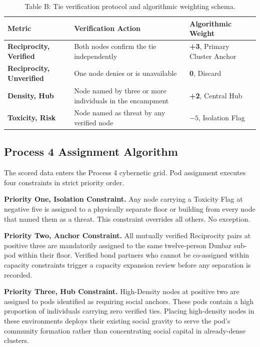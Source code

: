 \documentclass[12pt, letterpaper]{article}
\renewcommand{\arraystretch}{1.3}
\begin{document}
\begin{table}[H]
\renewcommand{\arraystretch}{1.2}
\begin{tabularx}{\textwidth}{@{} >{\raggedright\arraybackslash}p{3.5cm} >{\raggedright\arraybackslash}X >{\raggedright\arraybackslash}p{5.5cm} @{}}
\toprule
\textbf{Metric} & \textbf{Verification Action} & \textbf{Algorithmic Weight} \\
\midrule
\textbf{Reciprocity, Verified} & Both nodes confirm the tie independently & \textbf{+3}, Primary Cluster Anchor \\
\textbf{Reciprocity, Unverified} & One node denies or is unavailable & \textbf{0}, Discard \\
\textbf{Density, Hub} & Node named by three or more individuals in the encampment & \textbf{+2}, Central Hub \\
\textbf{Toxicity, Risk} & Node named as threat by any verified node & \textbf{$-5$}, Isolation Flag \\
\bottomrule
\end{tabularx}
\caption*{Table B: Tie verification protocol and algorithmic weighting schema.}
\end{table}

\subsection{Process 4 Assignment Algorithm}

The scored data enters the Process 4 cybernetic grid. Pod assignment executes four constraints in strict priority order.

\textbf{Priority One, Isolation Constraint.} Any node carrying a Toxicity Flag at negative five is assigned to a physically separate floor or building from every node that named them as a threat. This constraint overrides all others. No exception.

\textbf{Priority Two, Anchor Constraint.} All mutually verified Reciprocity pairs at positive three are mandatorily assigned to the same twelve-person Dunbar sub-pod within their floor. Verified bond partners who cannot be co-assigned within capacity constraints trigger a capacity expansion review before any separation is recorded.

\textbf{Priority Three, Hub Constraint.} High-Density nodes at positive two are assigned to pods identified as requiring social anchors. These pods contain a high proportion of individuals carrying zero verified ties. Placing high-density nodes in these environments deploys their existing social gravity to serve the pod's community formation rather than concentrating social capital in already-dense clusters.
\end{document}
